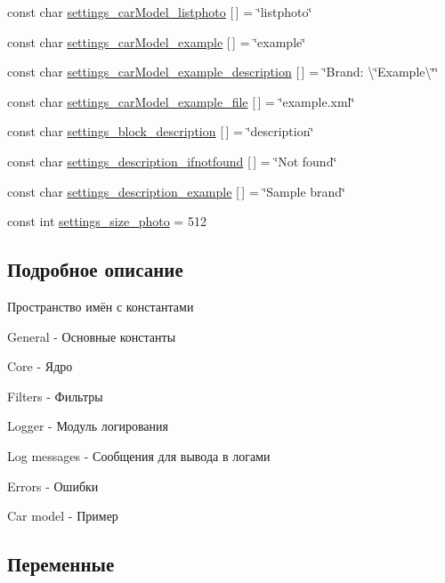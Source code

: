 \begin{DoxyCompactItemize}
const char \mbox{\hyperlink{namespaceyenot_a0a2414e62514c20e76cf0c522ebf38a3}{settings\+\_\+car\+Model\+\_\+listphoto}} \mbox{[}$\,$\mbox{]} = \char`\"{}listphoto\char`\"{}
\item 
const char \mbox{\hyperlink{namespaceyenot_af238d0e227de22ee3c26114077153efc}{settings\+\_\+car\+Model\+\_\+example}} \mbox{[}$\,$\mbox{]} = \char`\"{}example\char`\"{}
\item 
const char \mbox{\hyperlink{namespaceyenot_a5f4aa342b4a3e3f87069f6fef812594a}{settings\+\_\+car\+Model\+\_\+example\+\_\+description}} \mbox{[}$\,$\mbox{]} = \char`\"{}Brand\+: \textbackslash{}\char`\"{}Example\textbackslash{}\char`\"{}\char`\"{}
\item 
const char \mbox{\hyperlink{namespaceyenot_acd910e59eb17aa18802af8f4544aab48}{settings\+\_\+car\+Model\+\_\+example\+\_\+file}} \mbox{[}$\,$\mbox{]} = \char`\"{}example.\+xml\char`\"{}
\item 
const char \mbox{\hyperlink{namespaceyenot_aea7e9eb4d5b9e645f22e83e2d5fe893e}{settings\+\_\+block\+\_\+description}} \mbox{[}$\,$\mbox{]} = \char`\"{}description\char`\"{}
\item 
const char \mbox{\hyperlink{namespaceyenot_a53b4bd62fd7a6e3abedfdfb47db53284}{settings\+\_\+description\+\_\+ifnotfound}} \mbox{[}$\,$\mbox{]} = \char`\"{}Not found\char`\"{}
\item 
const char \mbox{\hyperlink{namespaceyenot_a37f90b0081fe0617055470d46489ea0f}{settings\+\_\+description\+\_\+example}} \mbox{[}$\,$\mbox{]} = \char`\"{}Sample brand\char`\"{}
\item 
const int \mbox{\hyperlink{namespaceyenot_a4e9a58fa114bcb3d3ae09fb62129f2c9}{settings\+\_\+size\+\_\+photo}} = 512
\end{DoxyCompactItemize}


\subsection{Подробное описание}
Пространство имён с константами 

General -\/ Основные константы

Core -\/ Ядро

Filters -\/ Фильтры

Logger -\/ Модуль логирования

Log messages -\/ Сообщения для вывода в логами

Errors -\/ Ошибки

Car model -\/ Пример 

\subsection{Переменные}
\mbox{\label{namespaceyenot_a3c950090a29f01a39ec562e1e30452b9}} 

